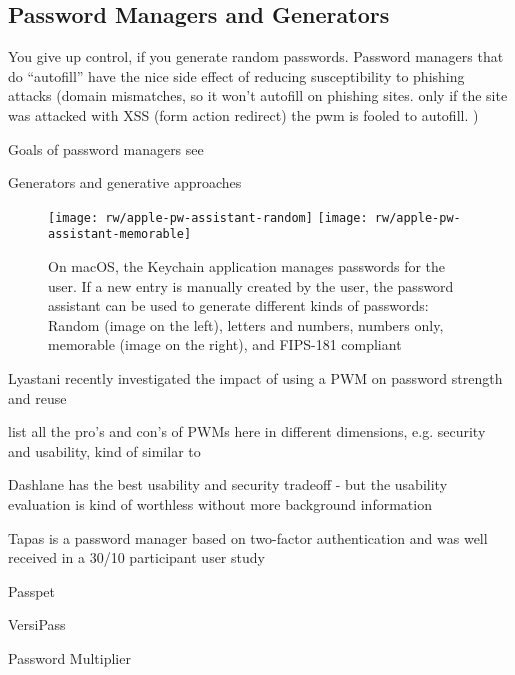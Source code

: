 	
	\subsection{Password Managers and Generators}
	
	You give up control, if you generate random passwords. 
	Password managers that do ``autofill'' have the nice side effect of reducing susceptibility to phishing attacks (domain mismatches, so it won't autofill on phishing sites. only if the site was attacked with XSS (form action redirect) the pwm is fooled to autofill. )
	
	Goals of password managers see \cite{Yee2006Passpet}
	
	Generators and generative approaches
	\begin{figure}
		\centering
		\texttt{[image: rw/apple-pw-assistant-random]}
		\texttt{[image: rw/apple-pw-assistant-memorable]}
		\caption{\label{fig:rw:pw_generators} On macOS, the Keychain application manages passwords for the user. If a new entry is manually created by the user, the password assistant can be used to generate different kinds of passwords: Random (image on the left), letters and numbers, numbers only, memorable (image on the right), and FIPS-181 compliant}
	\end{figure}
	
	Lyastani \etal recently investigated the impact of using a PWM on password strength and reuse \cite{Lyastani2017ImpactPWMPasswordStrength}
	
	list all the pro's and con's of PWMs here in different dimensions, e.g. security and usability, kind of similar to \cite{Bonneau2012ReplacePasswords}
	
	Dashlane has the best usability and security tradeoff - but the usability evaluation is kind of worthless without more background information \cite{AriasCabarcos2016ComparingPWM}
	
	Tapas is a password manager based on two-factor authentication and was well received in a 30/10 participant user study \cite{McCarney2012Tapas, McCarney2013PWMThesis}
	
	Passpet \cite{Yee2006Passpet}
	
	VersiPass \cite{Stobert2014PWMThatDoesntRemember}
	
	Password Multiplier \cite{Halderman2005ConvenientPWM}
	
